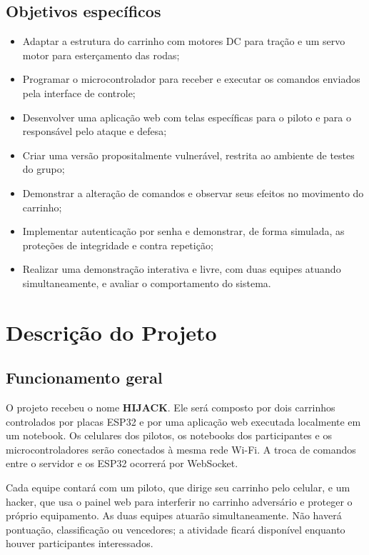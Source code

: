 \documentclass[12pt,a4paper]{article}
\begin{document}
\subsection{Objetivos específicos}
\begin{itemize}[leftmargin=*]
\item Adaptar a estrutura do carrinho com motores DC para tração e um servo motor para esterçamento das rodas;
\item Programar o microcontrolador para receber e executar os comandos enviados pela interface de controle;
\item Desenvolver uma aplicação web com telas específicas para o piloto e para o responsável pelo ataque e defesa;
\item Criar uma versão propositalmente vulnerável, restrita ao ambiente de testes do grupo;
\item Demonstrar a alteração de comandos e observar seus efeitos no movimento do carrinho;
\item Implementar autenticação por senha e demonstrar, de forma simulada, as proteções de integridade e contra repetição;
\item Realizar uma demonstração interativa e livre, com duas equipes atuando simultaneamente, e avaliar o comportamento do sistema.
\end{itemize}

\section{Descrição do Projeto}
\subsection{Funcionamento geral}
O projeto recebeu o nome \textbf{HIJACK}. Ele será composto por dois
carrinhos controlados por placas ESP32 e por uma aplicação web executada
localmente em um notebook. Os celulares dos pilotos, os notebooks dos
participantes e os microcontroladores serão conectados à mesma rede Wi-Fi.
A troca de comandos entre o servidor e os ESP32 ocorrerá por WebSocket.

Cada equipe contará com um piloto, que dirige seu carrinho pelo celular,
e um hacker, que usa o painel web para interferir no carrinho adversário e
proteger o próprio equipamento. As duas equipes atuarão simultaneamente.
Não haverá pontuação, classificação ou vencedores; a atividade ficará
disponível enquanto houver participantes interessados.
\end{document}
